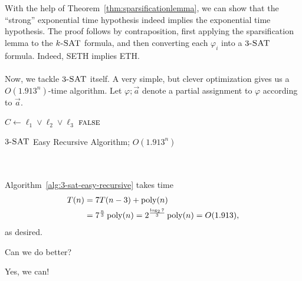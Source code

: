         \vphantom
        \\
        \\
        With the help of Theorem~\ref{thm:sparsificationlemma}, we can show that the ``strong'' exponential time hypothesis indeed implies the exponential time hypothesis. The proof follows by contraposition, first applying the sparsification lemma to the \(k\textsc{-SAT}\) formula, and then converting each \(\varphi_i\) into a \(3\textsc{-SAT}\) formula. Indeed, SETH implies ETH.
        \\
        \\
        Now, we tackle \(3\textsc{-SAT}\) itself. A very simple, but clever optimization gives us a \(O(1.913^n)\)-time algorithm. Let \(\varphi;\vec{a}\) denote a partial assignment to \(\varphi\) according to \(\vec{a}\).
        \begin{algorithm}[H] 
            \begin{algorithmic}[1]
                     \Return {} 
                    \EndIf
                    \State \(C\gets \ell_1\vee\ell_2\vee \ell_3\)
                        \State \Return {}
                    \EndFor
                    \State \Return \(\textsc{false}\)
                \EndProcedure 
            \end{algorithmic}
            \caption{\(3\textsc{-SAT}\) Easy Recursive Algorithm; \(O(1.913^n)\)}
            \label{alg:3-sat-easy-recursive}
        \end{algorithm}
        \vphantom
        \\
        \\
        Algorithm~\ref{alg:3-sat-easy-recursive} takes time
        \begin{align*}
            T(n)&=7T(n-3)+\operatorname{poly}(n) \\
            &=7^{\frac{n}{3}}\operatorname{poly}(n)=2^{\frac{\log_2 7}{3}}\operatorname{poly}(n)=O(1.913),
        \end{align*}
        as desired.
        \begin{question*}
            Can we do better?
        \end{question*}
        \begin{answer*}
            Yes, we can!
        \end{answer*}
